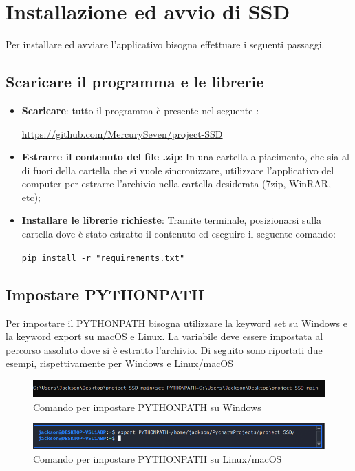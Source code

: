 \section{Installazione ed avvio di SSD}
Per installare ed avviare l'applicativo  bisogna effettuare i seguenti passaggi.
\subsection{Scaricare il programma e le librerie}

\begin{itemize}
	\item \textbf{Scaricare}: tutto il programma è presente nel seguente :\newline{}
\centerline{\url{https://github.com/MercurySeven/project-SSD}}

	\item \textbf{Estrarre il contenuto del file .zip}: In una cartella a piacimento, che sia al di fuori della cartella che si vuole sincronizzare, utilizzare l'applicativo del computer per estrarre l'archivio nella cartella desiderata (7zip, WinRAR, etc);
	\item \textbf{Installare le librerie richieste}:
	Tramite terminale, posizionarsi sulla cartella dove è stato estratto il contenuto ed eseguire il seguente comando:\newline{}
	\centerline{\texttt{pip install -r "requirements.txt"}}
\end{itemize}
\subsection{Impostare PYTHONPATH}
Per impostare il PYTHONPATH bisogna utilizzare la keyword set su Windows e la keyword export su macOS e Linux. La variabile deve essere impostata al percorso assoluto dove si è estratto l'archivio.
Di seguito sono riportati due esempi, rispettivamente per Windows e Linux/macOS
\begin{figure}[H]
    \centering
    \includegraphics[scale = 0.65]{components/img/Windows-istruzione-1.png}
    \caption{Comando per impostare PYTHONPATH su Windows}
    \label{fig:comando per impostare PYTHONPATH su windows}
\end{figure}
\begin{figure}[H]
    \centering
    \includegraphics[scale = 0.50]{components/img/linux-istruzione-1.jpg}
    \caption{ Comando per impostare PYTHONPATH su Linux/macOS}
    \label{fig:comando per impostare PYTHONPATH su windows}
\end{figure}
